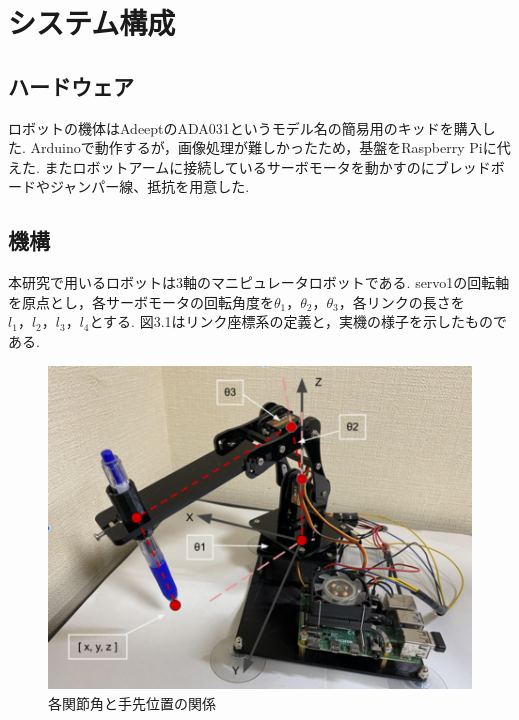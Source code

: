 \chapter{システム構成}
  \label{chap:system}
  \section{ハードウェア}
  	\label{chap:hardware}
 	ロボットの機体はAdeeptのADA031というモデル名の簡易用のキッドを購入した. Arduinoで動作するが，画像処理が難しかったため，基盤をRaspberry Piに代えた. またロボットアームに接続しているサーボモータを動かすのにブレッドボードやジャンパー線、抵抗を用意した.
  \section{機構}
  	\label{chap:mechanism}
	本研究で用いるロボットは3軸のマニピュレータロボットである. servo1の回転軸を原点とし，各サーボモータの回転角度を$\theta_1，\theta_2，\theta_3$，各リンクの長さを$l_1，l_2，l_3，l_4$とする. 図3.1はリンク座標系の定義と，実機の様子を示したものである.
		 \begin{center}
        \begin{figure}[h]
            \includegraphics[width=1.0\textwidth]{./img/004.png}
            \caption{各関節角と手先位置の関係}
            \label{test}
        \end{figure}
    \end{center}

